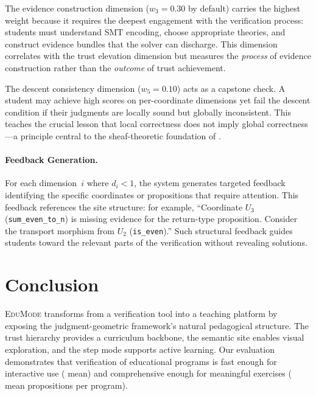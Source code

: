 \documentclass[11pt]{article}
\newcommand{\EduMode}{\textsc{EduMode}}
\begin{document}
The evidence construction dimension ($w_3 = 0.30$ by default) carries the
highest weight because it requires the deepest engagement with the
verification process: students must understand SMT encoding, choose
appropriate theories, and construct evidence bundles that the solver can
discharge. This dimension correlates with the trust elevation dimension
but measures the \emph{process} of evidence construction rather than the
\emph{outcome} of trust achievement.

The descent consistency dimension ($w_5 = 0.10$) acts as a capstone check.
A student may achieve high scores on per-coordinate dimensions yet fail
the descent condition if their judgments are locally sound but globally
inconsistent. This teaches the crucial lesson that local correctness does
not imply global correctness---a principle central to the sheaf-theoretic
foundation of \JuGeo{}.

\paragraph{Feedback Generation.}
For each dimension~$i$ where $d_i < 1$, the system generates targeted
feedback identifying the specific coordinates or propositions that
require attention. This feedback references the site structure: for
example, ``Coordinate $U_3$ (\texttt{sum\_even\_to\_n}) is missing
evidence for the return-type proposition. Consider the transport morphism
from $U_2$ (\texttt{is\_even}).'' Such structural feedback guides students
toward the relevant parts of the verification without revealing solutions.

\section{Conclusion}\label{sec:conclusion}

\EduMode{} transforms \JuGeo{} from a verification tool into a teaching
platform by exposing the judgment-geometric framework's natural pedagogical
structure. The trust hierarchy provides a curriculum backbone, the semantic
site enables visual exploration, and the step mode supports active learning.
Our evaluation demonstrates that verification of \ppLXVIprogramCount{}
educational programs is fast enough for interactive use (\ppLXVItimeMean{}
mean) and comprehensive enough for meaningful exercises (\ppLXVIpropsMean{}
mean propositions per program).
\end{document}
